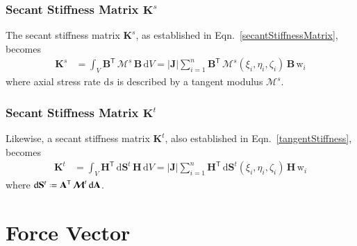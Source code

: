 \subsubsection{Secant Stiffness Matrix $\mathbf{K}^s$}

The secant stiffness matrix $\mathbf{K}^s$, as established in Eqn.~\eqref{secantStiffnessMatrix}, becomes
\begin{equation}
	\begin{aligned}
		\mathbf{K}^s & =\int_{V} \mathbf{B}^{\mathsf{T}} \,  \boldsymbol{\mathcal{M}}^s \, \mathbf{B}  \, \mathrm{d} V
		= |\mathbf{J}| \sum_{i=1}^{n}  \mathbf{B}^{\mathsf{T}} \, \boldsymbol{\mathcal{M}}^s (\xi_i, \eta_i, \zeta_i) \, \mathbf{B} \, \mathrm{w}_i 
	\end{aligned}
\end{equation} 
where axial stress rate $\mathrm{d} s$ is described by a tangent modulus $\boldsymbol{\mathcal{M}}^{s}$.


\subsubsection{Secant Stiffness Matrix $\mathbf{K}^t$}

Likewise, a secant stiffness matrix $\mathbf{K}^t$, also established in Eqn.~\eqref{tangentStiffness}, becomes 
\begin{equation}
	\begin{aligned}
		\mathbf{K}^t & = \int_{V} \mathbf{H}^{\mathsf{T}} \,  \mathrm{d} \mathbf{S}^t \, \mathbf{H}  \,  \mathrm{d} V
		= | \mathbf{J} | \sum_{i=1}^{n}  \mathbf{H}^{\mathsf{T}} \,  \mathrm{d} \mathbf{S}^t (\xi_i, \eta_i, \zeta_i) \, \mathbf{H} \, \mathrm{w}_i 
	\end{aligned}
\end{equation}
where $\mathrm{d} \mathbf{S}^t \defeq \mathbf{A}^{\mathsf{T}} \, \boldsymbol{\mathcal{M}}^t \, \mathrm{d} \mathbf{A}$.




\section{Force Vector}
\label{secForceVectors}



